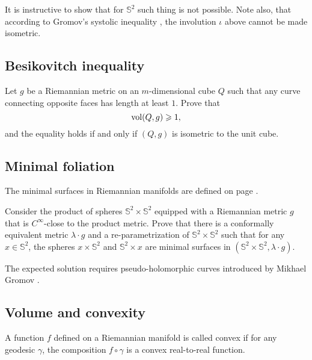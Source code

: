 It is instructive to show that for $\mathbb{S}^2$ such thing is not possible.
Note also, that according to Gromov's systolic inequality \cite[see][]{gromov-filling}, 
the involution $\iota$ above cannot be made isometric.

\subsection*{Besikovitch inequality}
\label{Besikovitch inequality}

\begin{pr}
Let $g$ be a Riemannian metric on an $m$-dimensional cube $Q$ such that any curve connecting opposite faces has length at least $1$. 
Prove that 
\[\operatorname{\rm vol}\nolimits(Q,g)\geqslant 1,\] 
and the equality holds if and only if $(Q,g)$ is isometric to the unit cube.
\end{pr}



\subsection*{Minimal foliation\thm}
\label{gromomorphic-curves}

The minimal surfaces in Riemannian manifolds are defined on page \pageref{minimal surface}.

\begin{pr}
Consider the product of spheres $\mathbb{S}^2\times \mathbb{S}^2$ equipped with a Riemannian metric $g$ that is $C^\infty$-close to the product metric. 
Prove that there is a conformally equivalent metric $\lambda\cdot g$ and a re-parametrization of $\mathbb{S}^2\times \mathbb{S}^2$
such that for any $x\in \mathbb{S}^2$, the spheres $x\times\mathbb{S}^2$ and $\mathbb{S}^2\times x$ are minimal surfaces 
in $(\mathbb{S}^2\times \mathbb{S}^2,\lambda\cdot g)$.
\end{pr}


The expected solution requires pseudo-holomorphic curves introduced by Mikhael Gromov \cite[see][]{gromov-pseudoholomorphic}.

\subsection*{Volume and convexity\thm}
\label{Volume and convexity} 

A function $f$ defined on a Riemannian manifold is called convex if for any geodesic $\gamma$, the composition $f\circ\gamma$ is a convex real-to-real function.

